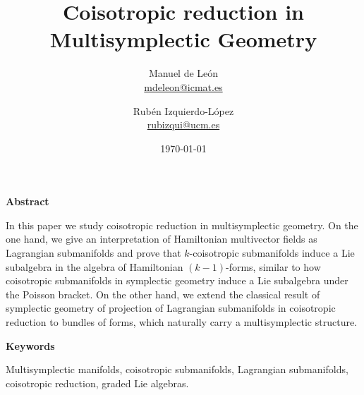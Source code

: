\documentclass[12pt]{article}
\newenvironment{keywords}
{
\begin{center}
\textbf{Keywords}\\
\vspace{0.17cm}
\begin{minipage}{14.5cm}}
{\footnotesize
\end{minipage}
\end{center}}
\newenvironment{Abstract}
{
\begin{center}
\textbf{Abstract}\\
\vspace{0.25cm}
\begin{minipage}{14.5cm}}
{\footnotesize
\end{minipage}
\end{center}}
\newcommand{\mail}[1]{\small\href{mailto:#1}{#1}}
\theoremstyle{definition}
\begin{document}
\title{\huge Coisotropic reduction in Multisymplectic Geometry}

\author{Manuel de León  \\ \mail{mdeleon@icmat.es}}


\author{Rubén Izquierdo-López  \\ \mail{rubizqui@ucm.es}}

\date{\today}

\maketitle

\begin{Abstract}
In this paper we study coisotropic reduction in multisymplectic geometry. On the one hand, we give an interpretation of Hamiltonian multivector fields as Lagrangian submanifolds and prove that $k$-coisotropic submanifolds induce a Lie subalgebra in the algebra of Hamiltonian $(k-1)$-forms, similar to how coisotropic submanifolds in symplectic geometry induce a Lie subalgebra under the Poisson bracket. On the other hand, we extend the classical result of symplectic geometry of projection of Lagrangian submanifolds in coisotropic reduction to bundles of forms, which naturally carry a multisymplectic structure.
\end{Abstract}

\begin{keywords}
Multisymplectic manifolds, coisotropic submanifolds, Lagrangian submanifolds, coisotropic reduction, graded Lie algebras.
\end{keywords}


\tableofcontents
\end{document}
